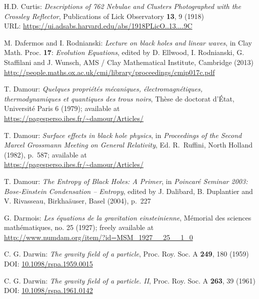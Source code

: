 \begin{thebibliography}{123}
H.D. Curtis:
{\em Descriptions of 762 Nebulae and Clusters Photographed with the Crossley Reflector},
Publications of Lick Observatory {\bf 13}, 9 (1918)\\
URL: \url{https://ui.adsabs.harvard.edu/abs/1918PLicO..13....9C}

M. Dafermos and I. Rodnianski: {\em Lecture on black holes and linear waves},
in  Clay Math. Proc. {\bf 17}: {\em Evolution Equations}, edited by
D. Ellwood, I. Rodnianski, G. Staffilani and J. Wunsch, AMS / Clay Mathematical Institute,
Cambridge (2013) \\
\url{http://people.maths.ox.ac.uk/cmi/library/proceedings/cmip017c.pdf}

T. Damour: {\em Quelques propri\'et\'es m\'ecaniques, \'electromagn\'etiques,
thermo\-dy\-na\-mi\-ques et quantiques des trous noirs},
Th\`ese de doctorat d'\'Etat, Universit\'e Paris 6 (1979); available at\\
\url{https://pagesperso.ihes.fr/~damour/Articles/}

T. Damour: {\em Surface effects in black hole physics},
in {\em Proceedings of the Second Marcel Grossmann Meeting on General
Relativity}, Ed. R.~Ruffini, North Holland (1982), p.~587; available at\\
\url{https://pagesperso.ihes.fr/~damour/Articles/}

T. Damour: {\em The Entropy of Black Holes: A Primer},
in {\em Poincaré Seminar 2003: Bose-Einstein Condensation -- Entropy},
edited by J. Dalibard, B. Duplantier and V. Rivasseau, Birkha\"auser, Basel (2004),
p.~227

G. Darmois:
{\em Les équations de la gravitation einsteinienne},
Mémorial des sciences mathématiques, no. 25 (1927); freely available at\\
\url{http://www.numdam.org/item/?id=MSM_1927__25__1_0}

C. G. Darwin: {\em The gravity field of a particle},
Proc. Roy. Soc. A {\bf 249}, 180 (1959)\\
DOI: \href{https://doi.org/10.1098/rspa.1959.0015}{10.1098/rspa.1959.0015}

C. G. Darwin: {\em The gravity field of a particle. II},
Proc. Roy. Soc. A {\bf 263}, 39 (1961)\\
DOI: \href{https://doi.org/10.1098/rspa.1961.0142}{10.1098/rspa.1961.0142}


\end{thebibliography}
